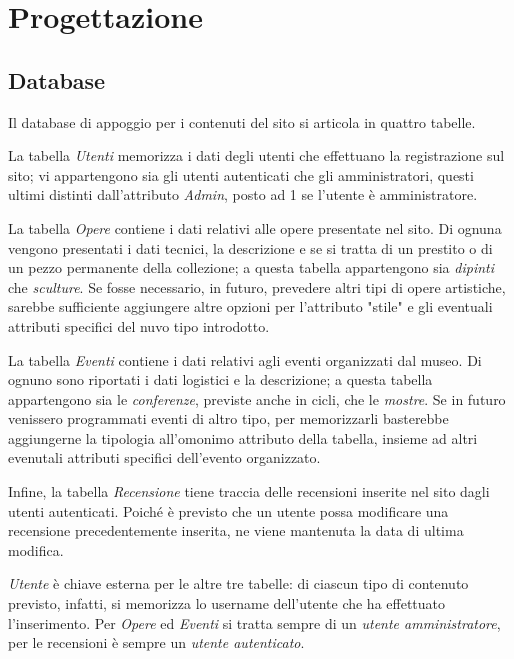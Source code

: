 \section{Progettazione}
\label{progettazione}

\subsection{Database}
\label{progettazione-database}
Il database di appoggio per i contenuti del sito si articola in quattro tabelle. 

La tabella \textit{Utenti} memorizza i dati degli utenti che effettuano la registrazione sul sito; vi appartengono sia gli utenti autenticati che gli amministratori, questi ultimi distinti dall'attributo \textit{Admin}, posto ad 1 se l'utente è amministratore.

La tabella \textit{Opere} contiene i dati relativi alle opere presentate nel sito. Di ognuna vengono presentati i dati tecnici, la descrizione e se si tratta di un prestito o di un pezzo permanente della collezione; a questa tabella appartengono sia \textit{dipinti} che \textit{sculture}. Se fosse necessario, in futuro, prevedere altri tipi di opere artistiche, sarebbe sufficiente aggiungere altre opzioni per l'attributo "stile" e gli eventuali attributi specifici del nuvo tipo introdotto.

La tabella \textit{Eventi} contiene i dati relativi agli eventi organizzati dal museo. Di ognuno sono riportati i dati logistici e la descrizione; a questa tabella appartengono sia le \textit{conferenze}, previste anche in cicli, che le \textit{mostre}. Se in futuro venissero programmati eventi di altro tipo, per memorizzarli basterebbe aggiungerne la tipologia all'omonimo attributo della tabella, insieme ad altri evenutali attributi specifici dell'evento organizzato.

Infine, la tabella \textit{Recensione} tiene traccia delle recensioni inserite nel sito dagli utenti autenticati. Poiché è previsto che un utente possa modificare una recensione precedentemente inserita, ne viene mantenuta la data di ultima modifica.

\textit{Utente} è chiave esterna per le altre tre tabelle: di ciascun tipo di contenuto previsto, infatti, si memorizza lo username dell'utente che ha effettuato l'inserimento. Per \textit{Opere} ed \textit{Eventi} si tratta sempre di un \textit{utente amministratore}, per le recensioni è sempre un \textit{utente autenticato}.

